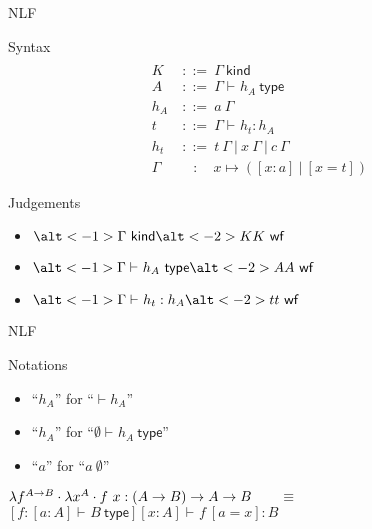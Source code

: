 \documentclass[ignorenonframetext,red]{beamer}
\newcommand\gor{\ |\ }
\newcommand\gequal{\ ::=\ }
\newcommand\postbinder{\cdot}
\newcommand\app[1]{{#1}\ }
\newcommand\tlam[2]{\ensuremath\lambda{#1}^{#2}\postbinder}
\newcommand\lam{\tlam}
\newcommand\eent[1]{\left[{#1}\right]}
\newcommand\econs[2]{{#1}\eent{#2}}
\newcommand\esing[1]{\econs{}{#1}}
\newcommand\jlangt[4]{{#2}\vdash_{\mathrm{#1}}{#3}:{#4}}
\newcommand\jlangA[3]{{#2}\vdash_{\mathrm{#1}}{#3}\mathsf{\ type}}
\newcommand\jlangK[3]{{#2}\vdash_{\mathrm{#1}}{#3}\mathsf{\ kind}}
\newcommand\jnlft[3]{\jlangt{}{#1}{#2}{#3}}
\newcommand\jnlfA[2]{\jlangA{}{#1}{#2}}
\newcommand\jnlfK[1]{{#1}\ \mathsf{kind}} %
\newcommand\jwf[1]{{#1}\ \mathsf{wf}}
\begin{document}
\begin{frame}{NLF}
  \begin{block}{Syntax}
    \begin{align*}
      \\[-3em]
      K &\gequal \jnlfK\Gamma \\
      A &\gequal \jnlfA\Gamma{h_A} \\
      h_A &\gequal \app a \Gamma \\
      t &\gequal \jnlft\Gamma{h_t}{h_A} \\
      h_t &\gequal \app t\Gamma \gor
      \app x\Gamma \gor \app c\Gamma \\
      \Gamma &\quad :\quad x \mapsto (\eent{x:a} \gor \eent{x=t})
    \end{align*}
  \end{block}
  \begin{overlayarea}{\textwidth}{\textwidth}
    \begin{block}{Judgements}
      \begin{itemize}
      \item $\alt<-1>{\jnlfK\Gamma}{\alt<-2> K {\jwf K}}$
      \item $\alt<-1>{\jnlfA\Gamma{h_A}}{\alt<-2> A {\jwf A}}$
      \item $\alt<-1>{\jnlft\Gamma{h_t}{h_A}}{\alt<-2> t {\jwf t}}$
      \end{itemize}
    \end{block}
  \end{overlayarea}
  \pause\pause
\end{frame}

\begin{frame}{NLF}
  \begin{block}{Notations}
    \begin{itemize}
    \item ``$h_A$'' for ``$\vdash h_A$''
    \item ``$h_A$'' for ``$\jnlfA{\emptyset}{h_A}$''
    \item ``$a$'' for ``$\app a \emptyset$''
    \end{itemize}
  \end{block}
  \begin{example}
    $\lam f {A\to B} \lam x A \app f x : (A\to B)\to A\to B\qquad\equiv$\\[0.5em]
    $\jnlft
    {\econs
      {\eent{f:\jnlfA{\eent{a:A}}{B}}}
      {x:A}}
    {\app f {\esing{a=x}}}
    {B}$
  \end{example}
\end{frame}
\end{document}
